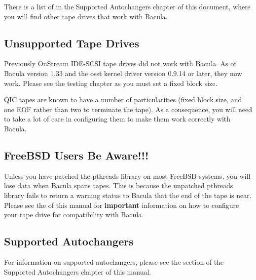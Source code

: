 There is a list of  in the Supported
Autochangers chapter of this document, where you will find other tape drives
that work with Bacula. 

\subsection*{Unsupported Tape Drives}
\label{UnSupportedDrives}

Previously OnStream IDE-SCSI tape drives did not work with Bacula. As of
Bacula version 1.33 and the osst kernel driver version 0.9.14 or later, they
now work. Please see the testing chapter as you must set a fixed block size. 

QIC tapes are known to have a number of particularities (fixed block size, and
one EOF rather than two to terminate the tape). As a consequence, you will
need to take a lot of care in configuring them to make them work correctly
with Bacula. 

\subsection*{FreeBSD Users Be Aware!!!}

Unless you have patched the pthreads library on most FreeBSD systems, you will
lose data when Bacula spans tapes. This is because the unpatched pthreads
library fails to return a warning status to Bacula that the end of the tape is
near. Please see the 
 of this manual for
{\bf important} information on how to configure your tape drive for
compatibility with Bacula. 

\subsection*{Supported Autochangers}

For information on supported autochangers, please see the 
section of the Supported Autochangers chapter of this manual. 

